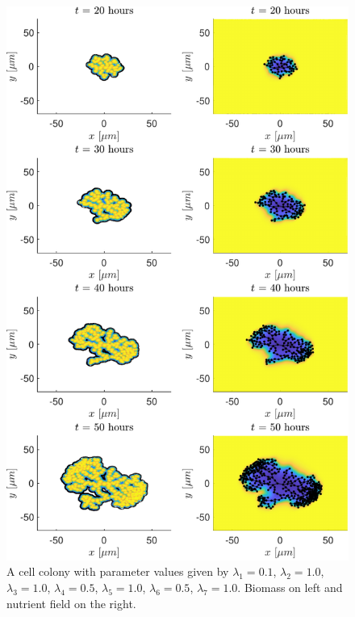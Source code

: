 \begin{figure}[!htb] %
    \centering
    \includegraphics[width= 1\textwidth]{
        chapter2/figures/t_all__L1_0o10_L2_1o00_L3_1o00_L4_0o50_L5_1o00_L6_0o50_L7_1o00.pdf}
    \caption{A cell colony with parameter values given by
             $\lambda_1 = 0.1$,  
             $\lambda_2 = 1.0$, 
             $\lambda_3 = 1.0$, 
             $\lambda_4 = 0.5$, 
             $\lambda_5 = 1.0$, 
             $\lambda_6 = 0.5$, 
             $\lambda_7 = 1.0$. 
             Biomass on left and nutrient field on the right.}
    \label{fig: sdsd}
\end{figure}


